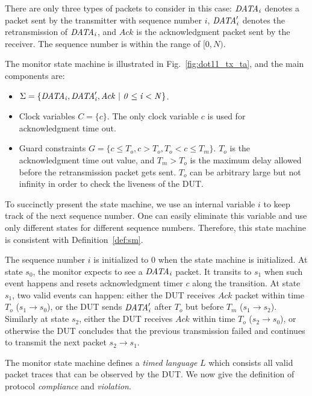 There are only three types of packets to consider in this case: $\it{DATA}_i$ denotes
a packet sent by the transmitter with sequence number $i$, $\it{DATA}'_i$ denotes the
retransmission of $\it{DATA}_i$, and $Ack$ is the acknowledgment packet sent by the
receiver.
%
The sequence number is within the range of $[0, N)$.


The monitor state machine is illustrated in Fig.~\ref{fig:dot11_tx_ta}, and
the main components are:

\begin{itemize}
  \item $\Sigma = \{\it{DATA}_i, \it{DATA}'_i, Ack\ |\ 0 \le i < N\}$.
  \item Clock variables $C = \{c\}$. The only clock variable $c$ is
    used for acknowledgment time out.
  \item Guard constraints $G = \{ c \le T_o, c > T_o, T_o < c \le T_m\}$.
    $T_o$ is the acknowledgment time out value, and $T_m >
    T_o$ is the maximum delay allowed before the retransmission packet gets
    sent. $T_o$ can be arbitrary large but not infinity in order to check the
    liveness of the DUT.
\end{itemize}



To succinctly present the state machine, we use an internal variable $i$ to keep
track of the next sequence number.
%
One can easily eliminate this variable and
use only different states for different sequence numbers.
%
Therefore, this state machine is consistent with Definition~\ref{def:sm}.



The sequence number $i$ is initialized to 0 when the state machine is
initialized.
%
At state $s_0$, the monitor expects to see a $\it{DATA}_i$ packet.
%
It transits to $s_1$ when such event happens and resets acknowledgment timer $c$ along the transition.
%
At state $s_1$, two valid events can happen: either the DUT receives $Ack$ packet
within time $T_o$ ($s_1\rightarrow s_0$), or the DUT sends $\it{DATA}'_i$ after $T_o$
but before $T_m$ ($s_1 \rightarrow s_2$).
%
Similarly at state $s_2$, either the DUT receives $Ack$ within time $T_o$ ($s_2
\rightarrow s_0$), or otherwise the DUT concludes that the previous transmission
failed and continues to transmit the next packet $s_2\rightarrow s_1$.

The monitor state machine defines a \textit{timed language} $L$ which consists
all valid packet traces that can be observed by the DUT.
%
We now give the
definition of protocol \textit{compliance} and \textit{violation}.


